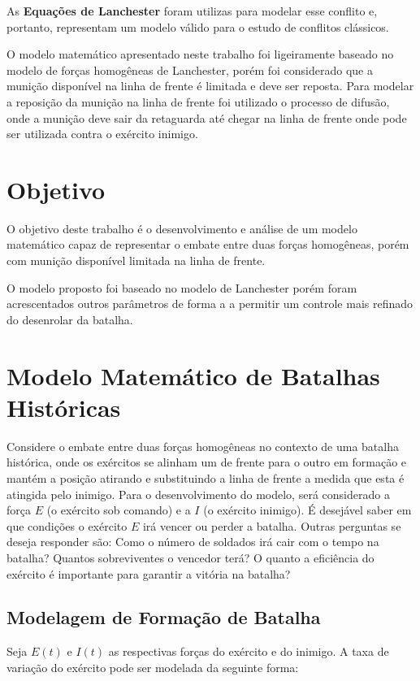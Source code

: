 \documentclass{article}
\begin{document}
As \textbf{Equações de Lanchester} foram utilizas para modelar esse conflito e, portanto, representam um modelo válido para o estudo de conflitos clássicos.

O modelo matemático apresentado neste trabalho foi ligeiramente baseado no modelo de forças homogêneas de Lanchester, porém foi considerado que a munição disponível na linha de frente é limitada e deve ser reposta. Para modelar a reposição da munição na linha de frente foi utilizado o processo de difusão, onde a munição deve sair da retaguarda até chegar na linha de frente onde pode ser utilizada contra o exército inimigo.

\section{Objetivo}

O objetivo deste trabalho é o desenvolvimento e análise de um modelo matemático capaz de representar o embate entre duas forças homogêneas, porém com munição disponível limitada na linha de frente. 

O modelo proposto foi baseado no modelo de Lanchester porém foram acrescentados outros parâmetros de forma a a permitir um controle mais refinado do desenrolar da batalha. 

\section{Modelo Matemático de Batalhas Históricas}

Considere o embate entre duas forças homogêneas no contexto de uma batalha histórica, onde os exércitos se alinham um de frente para o outro em formação e mantém a posição atirando e substituindo a linha de frente a medida que esta é atingida pelo inimigo. Para o desenvolvimento do modelo, será considerado a força $E$ (o exército sob comando) e a $I$ (o exército inimigo). É desejável saber em que condições o exército $E$ irá vencer ou perder a batalha. Outras perguntas se deseja responder são: Como o número de soldados irá cair com o tempo na batalha? Quantos sobreviventes o vencedor terá? O quanto a eficiência do exército é importante para garantir a vitória na batalha?

\subsection{Modelagem de Formação de Batalha}

Seja $E(t)$ e $I(t)$ as respectivas forças do exército e do inimigo. A taxa de variação do exército pode ser modelada da seguinte forma:
\end{document}
